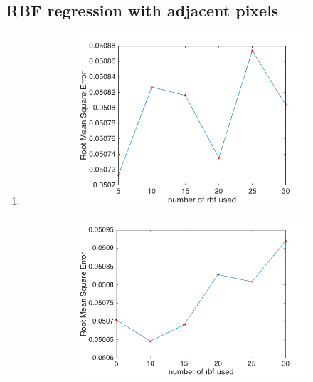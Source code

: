 \documentclass{article}
\begin{document}
		\subsection{RBF regression with adjacent pixels}
			\begin{enumerate}[label=(\alph*)]
				\item
				 	\begin{figure}[htbp]
				 		\caption{Root Mean Square Error against number of radial basis functions used}
				 		\begin{subfigure}{0.5\textwidth}
				 			\includegraphics[width=\linewidth]{images/p1-3-a_5_30.png}
				 			\caption{}
				 			\label{fig:p-1-3-a_a}
			 			\end{subfigure}
				 		\begin{subfigure}{0.5\textwidth}
				 			\includegraphics[width=\linewidth]{images/p1-3-a_5_30_another.png}

\end{subfigure}
\end{figure}
\end{enumerate}
\end{document}
